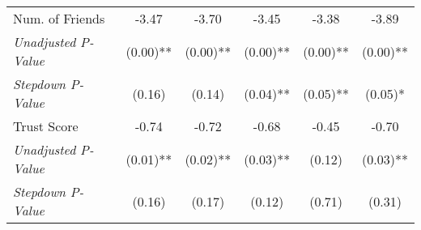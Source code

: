 \begin{tabular}{l c c c c c}
Num. of Friends & -3.47 & -3.70 & -3.45 & -3.38 & -3.89 \\
\quad \textit{Unadjusted P-Value} & (0.00)** & (0.00)** & (0.00)** & (0.00)** & (0.00)** \\
\quad \textit{Stepdown P-Value} & (0.16) & (0.14) & (0.04)** & (0.05)** & (0.05)* \\
Trust Score & -0.74 & -0.72 & -0.68 & -0.45 & -0.70 \\
\quad \textit{Unadjusted P-Value} & (0.01)** & (0.02)** & (0.03)** & (0.12) & (0.03)** \\
\quad \textit{Stepdown P-Value} & (0.16) & (0.17) & (0.12) & (0.71) & (0.31) \\
\bottomrule
\end{tabular}
